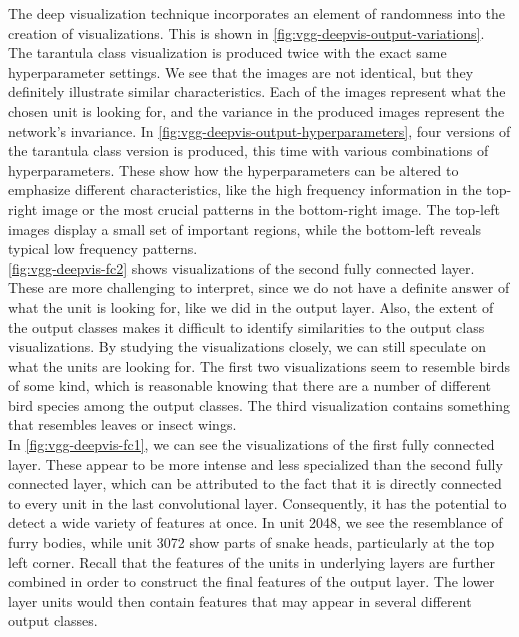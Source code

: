 \noindent The deep visualization technique incorporates an element of randomness into the creation of visualizations. This is shown in \autoref{fig:vgg-deepvis-output-variations}. The tarantula class visualization is produced twice with the exact same hyperparameter settings. We see that the images are not identical, but they definitely illustrate similar characteristics. Each of the images represent what the chosen unit is looking for, and the variance in the produced images represent the network's invariance. In \autoref{fig:vgg-deepvis-output-hyperparameters}, four versions of the tarantula class version is produced, this time with various combinations of hyperparameters. These show how the hyperparameters can be altered to emphasize different characteristics, like the high frequency information in the top-right image or the most crucial patterns in the bottom-right image. The top-left images display a small set of important regions, while the bottom-left reveals typical low frequency patterns. \\

\noindent \autoref{fig:vgg-deepvis-fc2} shows visualizations of the second fully connected layer. These are more challenging to interpret, since we do not have a definite answer of what the unit is looking for, like we did in the output layer. Also, the extent of the output classes makes it difficult to identify similarities to the output class visualizations. By studying the visualizations closely, we can still speculate on what the units are looking for. The first two visualizations seem to resemble birds of some kind, which is reasonable knowing that there are a number of different bird species among the output classes. The third visualization contains something that resembles leaves or insect wings. \\

\noindent In \autoref{fig:vgg-deepvis-fc1}, we can see the visualizations of the first fully connected layer. These appear to be more intense and less specialized than the second fully connected layer, which can be attributed to the fact that it is directly connected to every unit in the last convolutional layer. Consequently, it has the potential to detect a wide variety of features at once. In unit 2048, we see the resemblance of furry bodies, while unit 3072 show parts of snake heads, particularly at the top left corner. Recall that the features of the units in underlying layers are further combined in order to construct the final features of the output layer. The lower layer units would then contain features that may appear in several different output classes. \\

